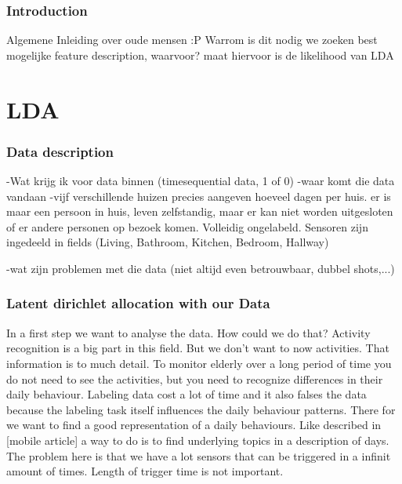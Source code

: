 \documentclass[11pt,a4paper]{report}
\begin{document}
\section{Introduction}
Algemene Inleiding over oude mensen :P
Warrom is dit nodig
we zoeken  best mogelijke feature description, waarvoor?
maat hiervoor is de likelihood van LDA



\part{LDA}




\section{Data description}
-Wat krijg ik voor data binnen (timesequential data, 1 of 0)
-waar komt die data vandaan
-vijf verschillende huizen precies aangeven hoeveel dagen per huis. er is maar een persoon in huis, leven zelfstandig, maar er kan niet worden uitgesloten of er andere personen op bezoek komen.
Volleidig ongelabeld.
Sensoren zijn ingedeeld in fields (Living, Bathroom, Kitchen, Bedroom, Hallway)

-wat zijn problemen met die data (niet altijd even betrouwbaar, dubbel shots,...)


\section{Latent dirichlet allocation with our Data}
In a first step we want to analyse the data. How could we do that? Activity recognition is a big part in this field. But we don't want to now activities. That information is to much detail. To monitor elderly over a long period of time you do not need to see the activities, but you need to recognize differences in their daily behaviour.
Labeling data cost a lot of time and it also falses the data because the labeling task itself influences the daily behaviour patterns. There for we want to find a good representation of a daily behaviours.
Like described in [mobile article] a way to do is to find underlying topics in a description of days.
The problem here is that we have a lot sensors that can be triggered in a infinit amount of times. Length of trigger time is not important.
\end{document}

